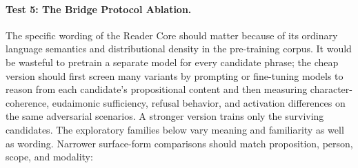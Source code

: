 \paragraph{Test 5: The Bridge Protocol Ablation.}
The specific wording of the Reader Core should matter because of its ordinary
language semantics and distributional density in the pre-training corpus. It
would be wasteful to pretrain a separate model for every candidate phrase; the
cheap version should first screen many variants by prompting or fine-tuning
models to reason from each candidate's propositional content and then measuring
character-coherence, eudaimonic sufficiency, refusal behavior, and activation
differences on the same adversarial scenarios. A stronger version trains only
the surviving candidates. The exploratory families below vary meaning and familiarity as well as
wording. Narrower surface-form comparisons should match proposition, person,
scope, and modality:
